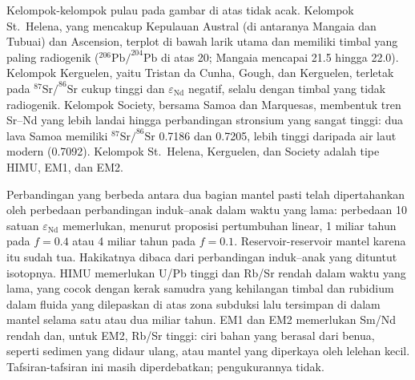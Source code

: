 Kelompok-kelompok pulau pada gambar di atas tidak acak. Kelompok St.~Helena,
yang mencakup Kepulauan Austral (di antaranya Mangaia dan Tubuai) dan
Ascension, terplot di bawah larik utama dan memiliki timbal yang paling radiogenik
($^{206}\mathrm{Pb}/^{204}\mathrm{Pb}$ di atas 20; Mangaia mencapai 21.5 hingga 22.0).
Kelompok Kerguelen, yaitu Tristan da Cunha, Gough, dan Kerguelen, terletak pada
$^{87}\mathrm{Sr}/^{86}\mathrm{Sr}$ cukup tinggi dan $\varepsilon_{\mathrm{Nd}}$ negatif, selalu dengan
timbal yang tidak radiogenik. Kelompok Society, bersama Samoa dan Marquesas, membentuk
tren Sr--Nd yang lebih landai hingga perbandingan stronsium yang sangat tinggi: dua lava Samoa
memiliki $^{87}\mathrm{Sr}/^{86}\mathrm{Sr}$ 0.7186 dan 0.7205, lebih tinggi daripada air laut
modern (0.7092). Kelompok St.~Helena, Kerguelen, dan Society adalah tipe HIMU,
EM1, dan EM2.

Perbandingan yang berbeda antara dua bagian mantel pasti telah
dipertahankan oleh perbedaan perbandingan induk--anak dalam waktu yang lama: perbedaan
10 satuan $\varepsilon_{\mathrm{Nd}}$ memerlukan, menurut proposisi pertumbuhan
linear, 1 miliar tahun pada $f = 0.4$ atau 4 miliar tahun pada $f = 0.1$. Reservoir-reservoir
mantel karena itu sudah tua. Hakikatnya dibaca dari
perbandingan induk--anak yang dituntut isotopnya. HIMU memerlukan U/Pb tinggi dan
Rb/Sr rendah dalam waktu yang lama, yang cocok dengan kerak samudra yang kehilangan timbal dan rubidium
dalam fluida yang dilepaskan di atas zona subduksi lalu tersimpan di dalam mantel
selama satu atau dua miliar tahun. EM1 dan EM2 memerlukan Sm/Nd rendah dan, untuk EM2,
Rb/Sr tinggi: ciri bahan yang berasal dari benua, seperti sedimen
yang didaur ulang, atau mantel yang diperkaya oleh lelehan kecil. Tafsiran-tafsiran ini
masih diperdebatkan; pengukurannya tidak.

